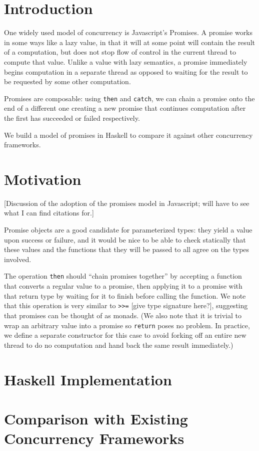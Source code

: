 \documentclass[sigplan,screen,review]{acmart}
\begin{document}
\section{Introduction}
One widely used model of concurrency is Javascript's Promises.  A promise works in some ways like a lazy value, in that it will at some point will contain the result of a computation, but does not stop flow of control in the current thread to compute that value.  Unlike a value with lazy semantics, a promise immediately begins computation in a separate thread as opposed to waiting for the result to be requested by some other computation.

Promises are composable: using \lstinline{then} and \lstinline{catch}, we can chain a promise onto the end of a different one creating a new promise that continues computation after the first has succeeded or failed respectively.

We build a model of promises in Haskell to compare it against other concurrency frameworks.
\section{Motivation}
[Discussion of the adoption of the promises model in Javascript; will have to see what I can find citations for.]

Promise objects are a good candidate for parameterized types: they yield a value upon success or failure, and it would be nice to be able to check statically that these values and the functions that they will be passed to all agree on the types involved.

The operation \lstinline{then} should ``chain promises together'' by accepting a function that converts a regular value to a promise, then applying it to a promise with that return type by waiting for it to finish before calling the function.  We note that this operation is very similar to \lstinline{>>=} [give type signature here?], suggesting that promises can be thought of as monads.  (We also note that it is trivial to wrap an arbitrary value into a promise so \lstinline{return} poses no problem.  In practice, we define a separate constructor for this case to avoid forking off an entire new thread to do no computation and hand back the same result immediately.)
\section{Haskell Implementation}

\section{Comparison with Existing Concurrency Frameworks}
\end{document}
